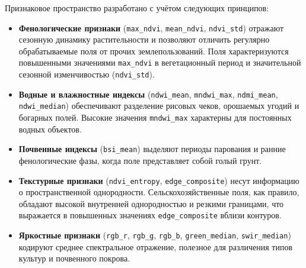 \documentclass[14pt,a4paper]{extarticle}
\newcommand{\tbl}[1]{\texttt{#1}}  %
\begin{document}
Признаковое пространство разработано с учётом следующих принципов:
\begin{itemize}
  \item \textbf{Фенологические признаки} (\tbl{max\_ndvi}, \tbl{mean\_ndvi},
        \tbl{ndvi\_std}) отражают сезонную динамику растительности
        и позволяют отличить регулярно обрабатываемые поля от прочих
        землепользований. Поля характеризуются повышенными значениями
        \tbl{max\_ndvi} в вегетационный период и значительной сезонной
        изменчивостью (\tbl{ndvi\_std}).

  \item \textbf{Водные и влажностные индексы} (\tbl{ndwi\_mean},
        \tbl{mndwi\_max}, \tbl{ndmi\_mean}, \tbl{ndwi\_median}) обеспечивают
        разделение рисовых чеков, орошаемых угодий и богарных полей.
        Высокие значения \tbl{mndwi\_max} характерны для постоянных
        водных объектов.

  \item \textbf{Почвенные индексы} (\tbl{bsi\_mean}) выделяют периоды
        парования и ранние фенологические фазы, когда поле представляет
        собой голый грунт.

  \item \textbf{Текстурные признаки} (\tbl{ndvi\_entropy},
        \tbl{edge\_composite}) несут информацию о пространственной
        однородности. Сельскохозяйственные поля, как правило, обладают
        высокой внутренней однородностью и резкими границами,
        что выражается в повышенных значениях \tbl{edge\_composite}
        вблизи контуров.

  \item \textbf{Яркостные признаки} (\tbl{rgb\_r}, \tbl{rgb\_g},
        \tbl{rgb\_b}, \tbl{green\_median}, \tbl{swir\_median}) кодируют
        среднее спектральное отражение, полезное для различения типов
        культур и почвенного покрова.
\end{itemize}
\end{document}
